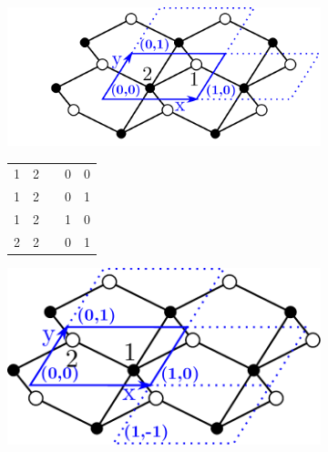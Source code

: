 \documentclass[thesis]{subfiles}
\begin{document}
\begin{otherlanguage}{french}
\begin{figure}[t]
\begin{subfigure}[b]{0.35\linewidth}
	\end{subfigure}%
	\begin{subfigure}[b]{0.35\linewidth}
		\hspace{-2em}\includegraphics[width=1\linewidth]{figures/topology/cells_12.pdf}
		
		\centering\begin{tabular}{ccccc}
			1&2&&0&0\\
			1&2&&0&1\\
			1&2&&1&0\\
			2&2&&0&1
		\end{tabular}
		
	\end{subfigure}
	\begin{subfigure}[b]{0.35\linewidth}
		\hspace{1.5em}
		\hspace{-2em}\includegraphics[width=0.8\linewidth]{figures/topology/cells_orig.pdf}
		\vspace{1em}
		

\end{subfigure}
\end{figure}
\end{otherlanguage}
\end{document}
